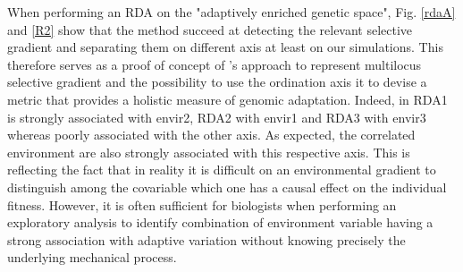 \documentclass[nogrid]{MBE}%
\begin{document}
When performing an RDA on the "adaptively enriched genetic space", Fig. \ref{rdaA} and \ref{R2} show that the method succeed at detecting the relevant selective gradient and separating them on different axis at least on our simulations. This therefore serves as a proof of concept of \citet{Steane2014a}'s approach to represent multilocus selective gradient and the possibility to use the ordination axis it to devise a metric that provides a holistic measure of genomic adaptation. Indeed, in RDA1 is strongly associated with envir2, RDA2 with envir1 and RDA3 with envir3 whereas poorly associated with the other axis. As expected, the correlated environment are also strongly associated with this respective axis. This is reflecting the fact that in reality it is difficult on an environmental gradient to distinguish  among the covariable which one has a causal effect on the individual fitness. However, it is often sufficient for biologists when performing an exploratory analysis to identify combination of environment variable having a strong association with adaptive variation without knowing precisely the underlying mechanical process.
\end{document}
